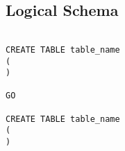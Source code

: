 \newpage
\subsection{Logical Schema}

\begin{verbatim}

CREATE TABLE table_name
(
)

GO

CREATE TABLE table_name
(
)


\end{verbatim}
